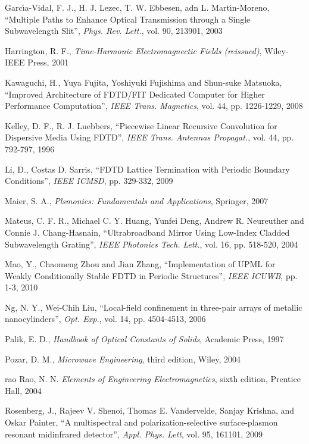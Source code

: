\begin{thebibliography}{999}
  \bibitem
  {}
  Garc\'\i{}a-Vidal, F. J., H. J. Lezec, T. W. Ebbesen, adn L. Mart\'\i{}n-Moreno,
  ``Multiple Paths to Enhance Optical Transmission through a Single Subwavelength Slit'',
  \textit{Phys. Rev. Lett.},
  vol. 90,
  213901,
  2003

  \bibitem
  {}
  Harrington, R. F.,
  \textit{Time-Harmonic Electromagnectic Fields (reissued)},
  Wiley-IEEE Press,
  2001

  \bibitem
  {}
  Kawaguchi, H., Yuya Fujita, Yoshiyuki Fujishima and Shun-suke Matsuoka,
  ``Improved Architecture of FDTD/FIT Dedicated Computer for Higher Performance Computation'',
  \textit{IEEE Trans. Magnetics},
  vol. 44,
  pp. 1226-1229,
  2008

  \bibitem
  {}
  Kelley, D. F., R. J. Luebbers,
  ``Piecewise Linear Recursive Convolution for Dispersive Media Using FDTD'',
  \textit{IEEE Trans. Antennas Propagat.},
  vol. 44,
  pp. 792-797,
  1996

  \bibitem
  {}
  Li, D., Costas D. Sarris,
  ``FDTD Lattice Termination with Periodic Boundary Conditions'',
  \textit{IEEE ICMSD},
  pp. 329-332,
  2009

  \bibitem
  {}
  Maier, S. A.,
  \textit{Plsmonics: Fundamentals and Applications},
  Springer,
  2007

  \bibitem
  {}
  Mateus, C. F. R., Michael C. Y. Huang, Yunfei Deng, Andrew R. Neureuther and Connie J. Chang-Hasnain,
  ``Ultrabroadband Mirror Using Low-Index Cladded Subwavelength Grating'',
  \textit{IEEE Photonics Tech. Lett.},
  vol. 16,
  pp. 518-520,
  2004

  \bibitem
  {}
  Mao, Y., Chaomeng Zhou and Jian Zhang,
  ``Implementation of UPML for Weakly Conditionally Stable FDTD in Periodic Structures'',
  \textit{IEEE ICUWB},
  pp. 1-3,
  2010

  \bibitem
  {}
  Ng, N. Y., Wei-Chih Liu,
  ``Local-field confinement in three-pair arrays of metallic nanocylinders'',
  \textit{Opt. Exp.},
  vol. 14,
  pp. 4504-4513,
  2006

  \bibitem
  {}
  Palik, E. D.,
  \textit{Handbook of Optical Constants of Solids},
  Academic Press,
  1997

  \bibitem
  {}
  Pozar, D. M.,
  \textit{Microwave Engineering}, third edition,
  Wiley,
  2004

  \bibitem
  {rao} 
  Rao, N. N.
  \textit{Elements of Engineering Electromagnetics}, sixth edition,
  Prentice Hall,
  2004

  \bibitem
  {}
  Rosenberg, J., Rajeev V. Shenoi, Thomas E. Vandervelde, Sanjay Krishna, and Oskar Painter,
  ``A multispectral and polarization-selective surface-plasmon resonant midinfrared detector'',
  \textit{Appl. Phys. Lett},
  vol. 95,
  161101,
  2009


\end{thebibliography}
